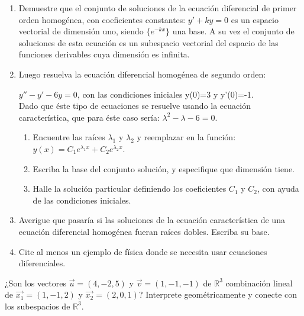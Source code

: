  
\begin{exercise} 
\item
 \begin{enumerate}
 
 \item 
 Demuestre que el conjunto de soluciones de la ecuación diferencial de primer orden homogénea, con coeficientes constantes:
 $y' + k y=0$ es un espacio vectorial de dimensión uno, siendo $\{e^{-kx}\}$ una base. A su vez el conjunto de soluciones de esta ecuación
 es un subespacio vectorial del espacio de las funciones derivables cuya dimensión es infinita.

\bigskip 
    
 
\item  Luego resuelva la ecuación diferencial homogénea de segundo orden:
 
 $y''- y' - 6y=0$, con las condiciones iniciales y(0)=3
 y y'(0)=-1.\\
 
  Dado que éste tipo de ecuaciones se resuelve usando la ecuación característica, que para éste caso sería:
 $\lambda^2-\lambda-6=0$.
 \begin{enumerate}
   
 \item Encuentre las raíces $\lambda_1$ y $\lambda_2$ y reemplazar en la función: $y(x)= C_1e^{\lambda_1 x}+C_2e^{\lambda_2 x}$.
 
 \item Escriba la base del conjunto solución, y especifique que dimensión tiene. 
 \item Halle la solución particular definiendo los coeficientes $C_1$ y $C_2$, con ayuda de las condiciones iniciales.
 \end{enumerate}
 \item Averigue que pasaría si las soluciones de la ecuación característica de una ecuación diferencial homogénea fueran raíces dobles. Escriba su base.
 
\item Cite al menos un ejemplo de física donde se necesita usar ecuaciones diferenciales.
\end{enumerate}
\end{exercise}

\begin{exercise}
\item

¿Son los vectores  $\vec{u}=(4,-2,5)$ y $\vec{v}=(1,-1,-1)$ de $\mathbb{R}^3$ combinación lineal
de $\vec{x_1}=(1,-1,2)$ y $\vec{x_2}=(2,0,1)$? Interprete geométricamente y conecte con los subespacios de 
$\mathbb{R}^3$.
\end{exercise}

